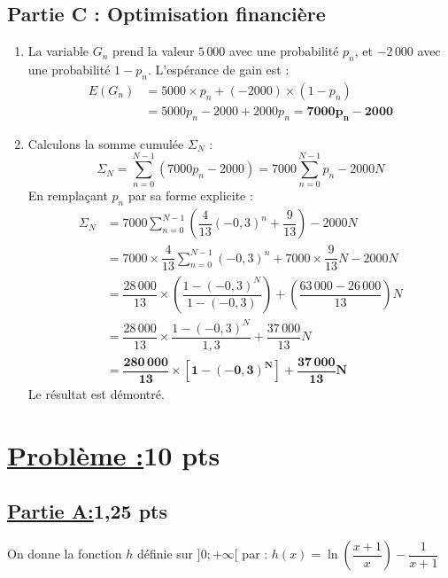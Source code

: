 \documentclass[12pt,a4paper]{article}
\begin{document}
\subsection*{Partie C : Optimisation financière}
\begin{enumerate}
    \item La variable $G_n$ prend la valeur $5\,000$ avec une probabilité $p_n$, et $-2\,000$ avec une probabilité $1-p_n$. L'espérance de gain est :
    \begin{align*}
        E(G_n) &= 5000 \times p_n + (-2000) \times (1 - p_n) \\
        &= 5000p_n - 2000 + 2000p_n = \mathbf{7000p_n - 2000}
    \end{align*}
    
    \item Calculons la somme cumulée $\Sigma_N$ :
    \[ \Sigma_N = \sum_{n=0}^{N-1} \left(7000p_n - 2000\right) = 7000 \sum_{n=0}^{N-1} p_n - 2000N \]
    En remplaçant $p_n$ par sa forme explicite :
    \begin{align*}
        \Sigma_N &= 7000 \sum_{n=0}^{N-1} \left( \dfrac{4}{13}(-0,3)^n + \dfrac{9}{13} \right) - 2000N \\
        &= 7000 \times \dfrac{4}{13} \sum_{n=0}^{N-1} (-0,3)^n + 7000 \times \dfrac{9}{13}N - 2000N \\
        &= \dfrac{28\,000}{13} \times \left( \dfrac{1 - (-0,3)^N}{1 - (-0,3)} \right) + \left( \dfrac{63\,000 - 26\,000}{13} \right)N \\
        &= \dfrac{28\,000}{13} \times \dfrac{1 - (-0,3)^N}{1,3} + \dfrac{37\,000}{13}N \\
        &= \mathbf{\dfrac{280\,000}{13} \times \left[1 - (-0,3)^N\right] + \dfrac{37\,000}{13}N}
    \end{align*}
    Le résultat est démontré.
\end{enumerate} 
 
\section*{\underline{Problème :}\quad\textbf{10 pts}} 

\subsection*{\underline{Partie A:}\quad\textbf{1,25 pts}}

On donne la fonction $h$ définie sur $]0 ; +\infty[$ par : $h(x) = \ln\left(\dfrac{x+1}{x}\right) - \dfrac{1}{x+1}$
\end{document}
